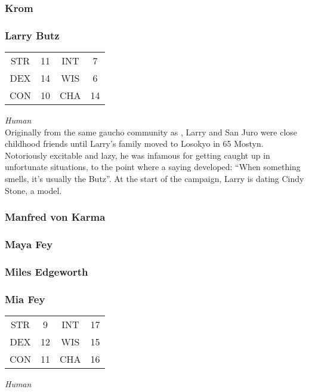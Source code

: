 \subsubsection{Krom}
\label{people:chrom}



\subsubsection{Larry Butz}
\label{people:larry}
\begin{center}
\begin{tabular}{c c|c c}
STR & 11 & INT & 7\\
DEX & 14 & WIS & 6 \\
CON & 10 & CHA & 14 \end{tabular}\end{center}
\textit{Human}\\
Originally from the same gaucho community as , Larry and San Juro were close childhood friends until Larry's family moved to Losokyo in 65 Mostyn. Notoriously excitable and lazy, he was infamous for getting caught up in unfortunate situations, to the point where a saying developed: ``When something smells, it's usually the Butz''. At the start of the campaign, Larry is dating Cindy Stone, a model.

\subsubsection{Manfred von Karma}
\label{people:mvonkarma}

\subsubsection{Maya Fey}
\label{people:mayafey}

\subsubsection{Miles Edgeworth}
\label{people:miles}

\subsubsection{Mia Fey}
\label{people:miafey}
\begin{center}
\begin{tabular}{c c|c c}
STR & 9 & INT & 17\\
DEX & 12 & WIS & 15 \\
CON & 11 & CHA & 16 \end{tabular}\end{center}
\textit{Human}\\



